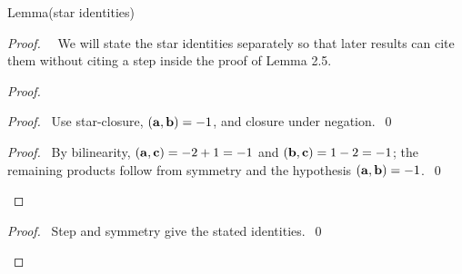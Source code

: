 \begin{namedresult}{Lemma}{(star identities)}\label{lem:star-identities}
\end{namedresult}
\begin{proof}
 \pfsketch\ \new\ We will state the star identities separately so that later results
 can cite them without citing a step inside the proof of Lemma 2.5.
 \begin{proof}
  \begin{proof}\pf\ Use star-closure, $({\mathbf a},{\mathbf b})=-1$, and closure under negation.~\qed\end{proof}
  \qedstep
  \begin{proof}
   \pf\ By bilinearity, $({\mathbf a},{\mathbf c})=-2+1=-1$ and $({\mathbf b},{\mathbf c})=1-2=-1$;
   the remaining products follow from symmetry and the hypothesis $({\mathbf a},{\mathbf b})=-1$.~\qed
  \end{proof}
 \end{proof}
 \qedstep
 \begin{proof}\pf\ Step  and symmetry give the stated identities.~\qed\end{proof}
\end{proof}

